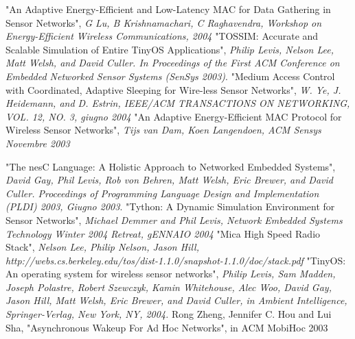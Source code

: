 \documentclass[twoside,11pt,a4paper,italian,openany]{book}
\begin{document}

\backmatter
\begin{thebibliography}{99}
 "An Adaptive Energy-Efficient and Low-Latency MAC for Data Gathering in Sensor Networks", \emph{G Lu, B Krishnamachari, C Raghavendra, Workshop on Energy-Efficient Wireless Communications, 2004} 
 "TOSSIM: Accurate and Scalable Simulation of Entire TinyOS Applications", \emph{Philip Levis, Nelson Lee, Matt Welsh, and David Culler. In Proceedings of the First ACM Conference on Embedded Networked Sensor Systems (SenSys 2003)}.  
   "Medium Access Control with Coordinated, Adaptive Sleeping for Wire-less Sensor Networks", \emph{W. Ye, J. Heidemann, and D. Estrin, IEEE/ACM TRANSACTIONS ON NETWORKING, VOL. 12, NO. 3, giugno 2004}
 "An Adaptive Energy-Efficient MAC Protocol for Wireless Sensor Networks", 
\emph{Tijs van Dam, Koen Langendoen,  ACM Sensys Novembre 2003}

 "The nesC Language: A Holistic Approach to Networked Embedded Systems", \emph{David Gay, Phil Levis, Rob von Behren, Matt Welsh, Eric Brewer, and David Culler. Proceedings of Programming Language Design and Implementation (PLDI) 2003, Giugno 2003}.
 "Tython: A Dynamic Simulation Environment for Sensor Networks", \emph{Michael Demmer and Phil Levis, Network Embedded Systems Technology Winter 2004 Retreat, gENNAIO 2004}
 "Mica High Speed Radio Stack", \emph{Nelson Lee, Philip Nelson, Jason Hill, http://webs.cs.berkeley.edu/tos/dist-1.1.0/snapshot-1.1.0/doc/stack.pdf}
"TinyOS: An operating system for wireless sensor networks", \emph{Philip Levis, Sam Madden, Joseph Polastre, Robert Szewczyk, Kamin Whitehouse, Alec Woo, David Gay, Jason Hill, Matt Welsh, Eric Brewer, and David Culler, in Ambient Intelligence, Springer-Verlag, New York, NY, 2004.}
 Rong Zheng, Jennifer C. Hou and Lui Sha, "Asynchronous Wakeup For Ad Hoc Networks", in ACM MobiHoc 2003


\end{thebibliography}
\end{document}
